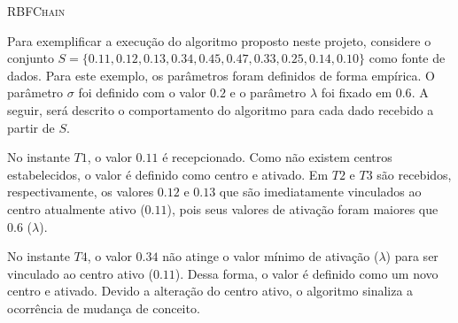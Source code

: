 \documentclass[msc, classic, a4paper]{ufbathesis}
\begin{document}
\vspace{7pt}
\begin{algorithm}[H]
    \SetAlgoLined

    \caption{\textsc{RBFChain}}
    \label{alg:algoritmo}
\end{algorithm}
\vspace{7pt}

Para exemplificar a execução do algoritmo proposto neste projeto, considere o conjunto $S = \{0.11, 0.12, 0.13, 0.34, 0.45, 0.47, 0.33, 0.25, 0.14, 0.10\}$ como fonte de dados.
Para este exemplo, os parâmetros foram definidos de forma empírica. O parâmetro \textit{$\sigma$} foi definido com o valor $0.2$ e o parâmetro \textit{$\lambda$} foi fixado em $0.6$.
A seguir, será descrito o comportamento do algoritmo para cada dado recebido a partir de $S$.

No instante $T1$, o valor $0.11$ é recepcionado. Como não existem centros estabelecidos, o valor é definido como centro e ativado.
Em $T2$ e $T3$ são recebidos, respectivamente, os valores $0.12$ e $0.13$ que são imediatamente vinculados ao centro atualmente ativo ($0.11$), pois seus valores de ativação foram maiores que $0.6$ ($\lambda$).

No instante $T4$, o valor $0.34$ não atinge o valor mínimo de ativação (\textit{$\lambda$}) para ser vinculado ao centro ativo ($0.11$).
Dessa forma, o valor é definido como um novo centro e ativado.
Devido a alteração do centro ativo, o algoritmo sinaliza a ocorrência de mudança de conceito.
\end{document}
